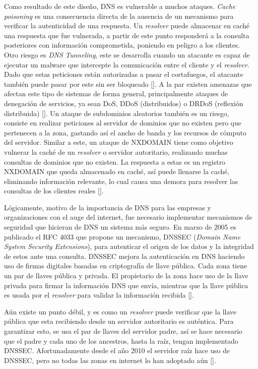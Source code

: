 Como resultado de este diseño, DNS es vulnerable a muchos ataques. \textit{Cache poisoning} es una consecuencia directa de la ausencia de un mecanismo para verificar la autenticidad de una respuesta. Un \textit{resolver} puede almacenar en caché una respuesta que fue vulnerada, a partir de este punto responderá a la consulta posteriores con información comprometida, poniendo en peligro a los clientes. Otro riesgo es \textit{DNS Tunneling}, este se desarrolla cuando un atacante es capaz de ejecutar un malware que intercepte la comunicación entre el cliente y el \textit{resolver}. Dado que estas peticiones están autorizadas a pasar el cortafuegos, el atacante también puede pasar por este sin ser bloqueado [\cite{dns-tunneling}]. A la par existen amenazas que afectan este tipo de sistemas de forma general, principalmente ataques de denegación de servicios, ya sean DoS, DDoS (distribuidos) o DRDoS (reflexión distribuida) [\cite{dns-attacks}]. Un ataque de subdominios aleatorios también es un riesgo, consiste en realizar peticiones al servidor de dominios que no existen pero que pertenecen a la zona, gastando así el ancho de banda y los recursos de cómputo del servidor. Similar a este, un ataque de NXDOMAIN tiene como objetivo vulnerar la caché de un \textit{resolver} o servidor autoritario, realizando muchas consultas de dominios que no existen. La respuesta a estas es un registro NXDOMAIN que queda almacenado en caché, así puede llenarse la caché, eliminando información relevante, lo cual causa una demora para resolver las consultas de los clientes reales [\cite{dns-attacks-ident-prot}].

Lógicamente, motivo de la importancia de DNS para las empresas y organizaciones con el auge del internet, fue necesario implementar mecanismos de seguridad que hicieran de DNS un sistema más seguro. En marzo de 2005 es publicado el RFC 4033 que propone un mecanismo, DNSSEC (\textit{Domain Name System Security Extensions}), para autenticar el origen de los datos y la integridad de estos ante una consulta. DNSSEC mejora la autenticación en DNS haciendo uso de firmas digitales basadas en criptografía de llave pública. Cada zona tiene un par de llaves pública y privada. El propietario de la zona hace uso de la llave privada para firmar la información DNS que envía, mientras que la llave pública es usada por el \textit{resolver} para validar la información recibida [\cite{new-approach-dnssec}].

Aún existe un punto débil, y es como un \textit{resolver} puede verificar que la llave pública que esta recibiendo desde un servidor autoritario es auténtica. Para garantizar esto, se usa el par de llaves del servidor padre, así se hace necesario que el padre y cada uno de los ancestros, hasta la raíz, tengan implementado DNSSEC. Afortunadamente desde el año 2010 el servidor raíz hace uso de DNSSEC, pero no todas las zonas en internet lo han adoptado aún [\cite{dnssec-icann}].

